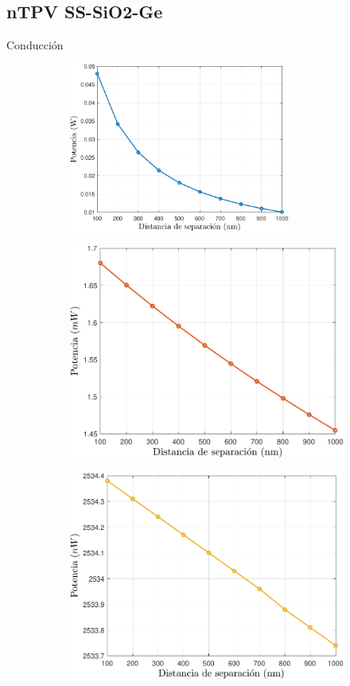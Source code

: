 \documentclass[spanish,a4paper]{beamer}%
\newcommand{\resCondPath}{\graphicspath{{./figuras/Resultados/conduccion/}}}
\begin{document}
	\subsection{nTPV SS-SiO2-Ge}
		\begin{frame}{Conducción}
			\resCondPath
			\begin{figure}[h]%
				\centering
				\begin{subfigure}[b]{0.48\textwidth}\centering
					\includegraphics[width=0.8\textwidth]{Pn_SsSiO2Ge}%
				\end{subfigure}\hfill
				\begin{subfigure}[b]{0.48\textwidth}\centering
					\includegraphics[width=.8\textwidth]{Prc_SsSiO2Ge_Emp}%
				\end{subfigure}\hfill
				\begin{subfigure}[b]{0.48\textwidth}\centering
					\includegraphics[width=.8\textwidth]{Prc_SsSiO2Ge_Inter}%

\end{subfigure}
\end{figure}
\end{frame}
\end{document}
